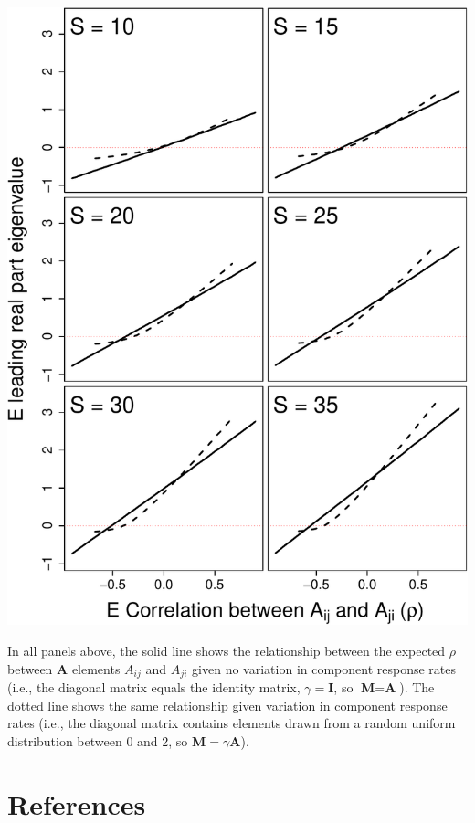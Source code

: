 \documentclass[]{article}
\begin{document}
\includegraphics{revision_notes_files/figure-latex/unnamed-chunk-13-1.pdf}

In all panels above, the solid line shows the relationship between the
expected \(\rho\) between \(\textbf{A}\) elements \(A_{ij}\) and
\(A_{ji}\) given no variation in component response rates (i.e., the
diagonal matrix equals the identity matrix, \(\gamma = \textbf{I}\), so
\(\textbf{M} = \textbf{A}\)). The dotted line shows the same
relationship given variation in component response rates (i.e., the
diagonal matrix contains elements drawn from a random uniform
distribution between 0 and 2, so \(\textbf{M} = \gamma\textbf{A}\)).

\hypertarget{references}{%
\section*{References}\label{references}}
\end{document}
